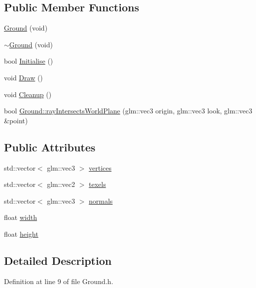 \subsection*{Public Member Functions}
\begin{DoxyCompactItemize}
\item 
\hyperlink{class_b_g_e_1_1_ground_a8f8d7a8d37906527cc87a9e61807a8a5}{Ground} (void)
\item 
\hyperlink{class_b_g_e_1_1_ground_a57b0f168d1188e00519dbb2d79b864f7}{$\sim$\-Ground} (void)
\item 
bool \hyperlink{class_b_g_e_1_1_ground_ad9ebaf73b2e0c1feb2f09bd7daa0cd9f}{Initialise} ()
\item 
void \hyperlink{class_b_g_e_1_1_ground_a04f88aa7573b77ecb1ed103dd27ae190}{Draw} ()
\item 
void \hyperlink{class_b_g_e_1_1_ground_ab5631a3427be2de6998c6fa9bcebdc24}{Cleanup} ()
\item 
bool \hyperlink{class_b_g_e_1_1_ground_a4eb8f71dcfe6eca68f7fe77e41ddf802}{Ground\-::ray\-Intersects\-World\-Plane} (glm\-::vec3 origin, glm\-::vec3 look, glm\-::vec3 \&point)
\end{DoxyCompactItemize}
\subsection*{Public Attributes}
\begin{DoxyCompactItemize}
\item 
std\-::vector$<$ glm\-::vec3 $>$ \hyperlink{class_b_g_e_1_1_ground_abbdcaa953344fcb3d742a0829823b2a5}{vertices}
\item 
std\-::vector$<$ glm\-::vec2 $>$ \hyperlink{class_b_g_e_1_1_ground_a93187bd4ab9d67b14ae3ae140c12a0ed}{texels}
\item 
std\-::vector$<$ glm\-::vec3 $>$ \hyperlink{class_b_g_e_1_1_ground_a1b9a708b7fa56dfd5aa0c1a60d1826eb}{normals}
\item 
float \hyperlink{class_b_g_e_1_1_ground_a20e9434f0de2737957c4ab23377942e0}{width}
\item 
float \hyperlink{class_b_g_e_1_1_ground_a05be7c85e646d088a59102805bea4d5a}{height}
\end{DoxyCompactItemize}


\subsection{Detailed Description}


Definition at line 9 of file Ground.\-h.



